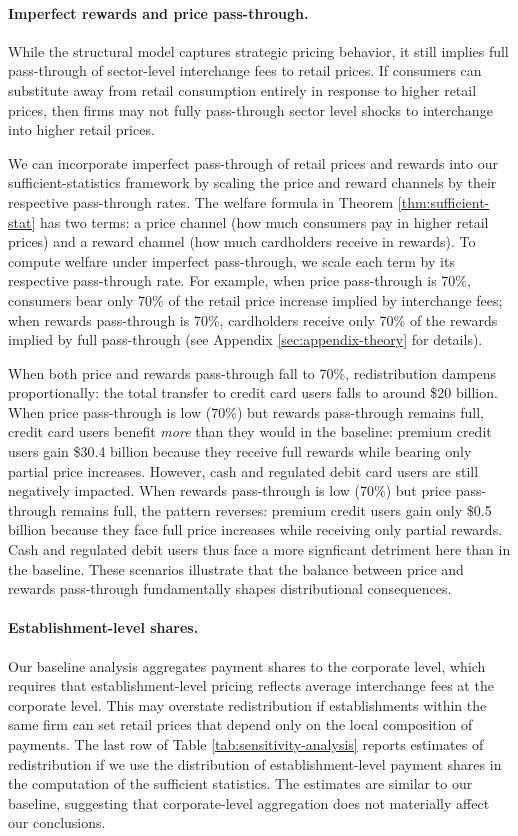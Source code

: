 \documentclass[main.tex]{subfiles}
\begin{document}
\paragraph{Imperfect rewards and price pass-through.}
While the structural model captures strategic pricing behavior, it still implies full pass-through of sector-level interchange fees to retail prices.
If consumers can substitute away from retail consumption entirely in response to higher retail prices, then firms may not fully pass-through sector level shocks to interchange into higher retail prices.

We can incorporate imperfect pass-through of retail prices and rewards into our sufficient-statistics framework by scaling the price and reward channels by their respective pass-through rates.
The welfare formula in Theorem \ref{thm:sufficient-stat} has two terms: a price channel (how much consumers pay in higher retail prices) and a reward channel (how much cardholders receive in rewards).
To compute welfare under imperfect pass-through, we scale each term by its respective pass-through rate.
For example, when price pass-through is 70\%, consumers bear only 70\% of the retail price increase implied by interchange fees; when rewards pass-through is 70\%, cardholders receive only 70\% of the rewards implied by full pass-through (see Appendix \ref{sec:appendix-theory} for details).

When both price and rewards pass-through fall to 70\%, redistribution dampens proportionally: the total transfer to credit card users falls to around \$20 billion.
When price pass-through is low (70\%) but rewards pass-through remains full, credit card users benefit \textit{more} than they would in the baseline: premium credit users gain \$30.4 billion because they receive full rewards while bearing only partial price increases. 
However, cash and regulated debit card users are still negatively impacted.
When rewards pass-through is low (70\%) but price pass-through remains full, the pattern reverses: premium credit users gain only \$0.5 billion because they face full price increases while receiving only partial rewards.
Cash and regulated debit users thus face a more signficant detriment here than in the baseline.
These scenarios illustrate that the balance between price and rewards pass-through fundamentally shapes distributional consequences.

\paragraph{Establishment-level shares.}
Our baseline analysis aggregates payment shares to the corporate level, which requires that establishment-level pricing reflects average interchange fees at the corporate level. 
This may overstate redistribution if establishments within the same firm can set retail prices that depend only on the local composition of payments.
The last row of Table \ref{tab:sensitivity-analysis} reports estimates of redistribution if we use the distribution of establishment-level payment shares in the computation of the sufficient statistics.
The estimates are similar to our baseline, suggesting that corporate-level aggregation does not materially affect our conclusions.
\end{document}
